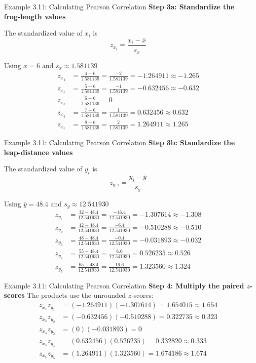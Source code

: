 \documentclass[aspectratio=169]{beamer}
\begin{document}
\begin{frame}{Example 3.11: Calculating Pearson Correlation}
\footnotesize
\textbf{Step 3a: Standardize the frog-length values}

The standardized value of $x_i$ is
\[
z_{x_{i}}=\frac{x_i-\bar{x}}{s_x}
\]

Using $\bar{x}=6$ and $s_x\approx1.581139$
\[
\begin{aligned}
z_{x_1}
&=\frac{4-6}{1.581139} =\frac{-2}{1.581139} =-1.264911 \approx -1.265 \\[1mm]
z_{x_2}
&=\frac{5-6}{1.581139} =\frac{-1}{1.581139} =-0.632456 \approx -0.632 \\[1mm]
z_{x_3}
&=\frac{6-6}{1.581139} =0\\[1mm] 
z_{x_4}
&=\frac{7-6}{1.581139} =\frac{1}{1.581139} =0.632456 \approx 0.632 \\[1mm]
z_{x_5}
&=\frac{8-6}{1.581139} =\frac{2}{1.581139} =1.264911 \approx 1.265
\end{aligned}
\]
\end{frame}

\begin{frame}{Example 3.11: Calculating Pearson Correlation}
\footnotesize
\textbf{Step 3b: Standardize the leap-distance values}

The standardized value of $y_i$ is
\[
	z_{y,i}=\frac{y_i-\bar{y}}{s_y}
\]

Using $\bar{y}=48.4$ and $s_y\approx12.541930$
\[
\begin{aligned}
z_{y_1}
&=\frac{32-48.4}{12.541930} =\frac{-16.4}{12.541930} =-1.307614 \approx -1.308 \\[1mm]
z_{y_2}
&=\frac{42-48.4}{12.541930} =\frac{-6.4}{12.541930} =-0.510288 \approx -0.510\\[1mm]
z_{y_3}
&=\frac{48-48.4}{12.541930} =\frac{-0.4}{12.541930} =-0.031893 \approx -0.032 \\[1mm]
z_{y_4}
&=\frac{55-48.4}{12.541930} =\frac{6.6}{12.541930} =0.526235 \approx 0.526 \\[1mm]
z_{y_5}
&=\frac{65-48.4}{12.541930} =\frac{16.6}{12.541930} =1.323560 \approx 1.324
\end{aligned}
\]

\end{frame}

\begin{frame}{Example 3.11: Calculating Pearson Correlation}
\small
\textbf{Step 4: Multiply the paired $z$-scores}
\vspace{0.2cm}
The products use the unrounded $z$-scores:
\[
\begin{aligned}
z_{x_1}z_{y_1}
&=(-1.264911)(-1.307614) =1.654015 \approx1.654 \\[1mm] 
z_{x_2}z_{y_2}
&=(-0.632456)(-0.510288) =0.322735 \approx0.323 \\[1mm]
z_{x_3}z_{y_3}
&=(0)(-0.031893) =0 \\[1mm]
z_{x_4}z_{y_4}
&=(0.632456)(0.526235) =0.332820 \approx0.333\\[1mm]
z_{x_5}z_{y_5}
&=(1.264911)(1.323560) =1.674186 \approx1.674
\end{aligned}
\]
\end{frame}
\end{document}
